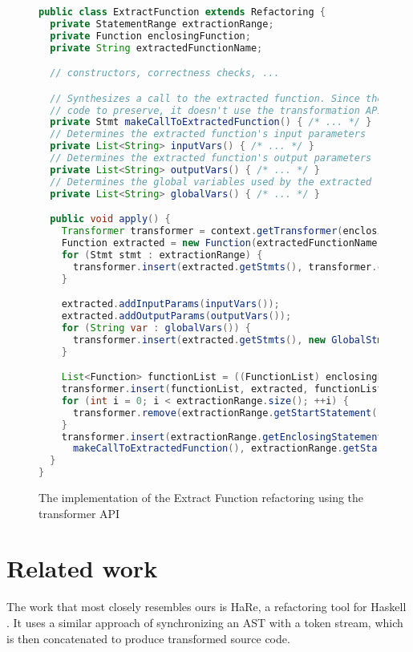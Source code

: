 \begin{figure}
\begin{lstlisting}[numbers=none, language=Java]
public class ExtractFunction extends Refactoring {
  private StatementRange extractionRange;
  private Function enclosingFunction;
  private String extractedFunctionName;

  // constructors, correctness checks, ...

  // Synthesizes a call to the extracted function. Since there is no
  // code to preserve, it doesn't use the transformation API.
  private Stmt makeCallToExtractedFunction() { /* ... */ }
  // Determines the extracted function's input parameters
  private List<String> inputVars() { /* ... */ }
  // Determines the extracted function's output parameters
  private List<String> outputVars() { /* ... */ }
  // Determines the global variables used by the extracted function
  private List<String> globalVars() { /* ... */ }

  public void apply() {
    Transformer transformer = context.getTransformer(enclosingFunction);
    Function extracted = new Function(extractedFunctionName);
    for (Stmt stmt : extractionRange) {
      transformer.insert(extracted.getStmts(), transformer.copy(stmt), extracted.getNumStmt());
    }

    extracted.addInputParams(inputVars());
    extracted.addOutputParams(outputVars());
    for (String var : globalVars()) {
      transformer.insert(extracted.getStmts(), new GlobalStmt(var), 0);
    }

    List<Function> functionList = ((FunctionList) enclosingFunction.getParent()).getFunctions();
    transformer.insert(functionList, extracted, functionList.getIndexOfChild(enclosingFunction) + 1);
    for (int i = 0; i < extractionRange.size(); ++i) {
      transformer.remove(extractionRange.getStartStatement());
    }
    transformer.insert(extractionRange.getEnclosingStatementList(),
      makeCallToExtractedFunction(), extractionRange.getStartIndex());
  }
}
\end{lstlisting}
\caption{The implementation of the Extract Function refactoring using the transformer API}
\label{Fig:ExtractFunction}
\end{figure}

\section{Related work}

The work that most closely resembles ours is HaRe, a refactoring tool for
Haskell \cite{HaRe}. It uses a similar approach of synchronizing an AST with a
token stream, which is then concatenated to produce transformed source code.

